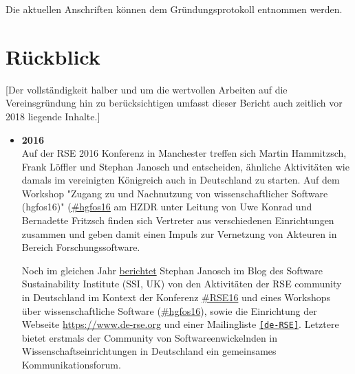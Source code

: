 Die aktuellen Anschriften können dem Gründungsprotokoll entnommen werden.

\section{Rückblick}

[Der vollständigkeit halber und um die wertvollen Arbeiten auf die Vereinsgründung hin zu berücksichtigen umfasst dieser Bericht auch zeitlich vor 2018 liegende Inhalte.]

\begin{itemize}
 \item \textbf{2016}\\
 Auf der RSE 2016 Konferenz in Manchester treffen sich Martin Hammitzsch, Frank Löffler und Stephan Janosch und entscheiden, ähnliche Aktivitäten wie damals im vereinigten Königreich auch in Deutschland zu starten. Auf dem Workshop "Zugang zu und Nachnutzung von wissenschaftlicher Software (hgfos16)" (\href{https://twitter.com/hashtag/hgfos16}{\#hgfos16} am HZDR unter Leitung von Uwe Konrad und Bernadette Fritzsch finden sich Vertreter aus verschiedenen Einrichtungen zusammen und geben damit einen Impuls zur Vernetzung von Akteuren in Bereich Forschungssoftware.  
 
 Noch im gleichen Jahr \href{https://www.software.ac.uk/blog/2016-12-19-research-software-germany-brief-report-efforts-autumn-2016}{berichtet} Stephan Janosch im Blog des Software Sustainability Institute (SSI, UK) von den Aktivitäten der RSE community in Deutschland im Kontext der Konferenz \href{https://ukrse.github.io/conf2016.html}{\#RSE16} und eines Workshops über wissenschaftliche Software (\href{https://twitter.com/hashtag/hgfos16}{\#hgfos16}), sowie die Einrichtung der Webseite \href{https://www.de-rse.org}{https://www.de-rse.org} und einer Mailingliste \href{https://ml-cgn04.ispgateway.de/mailman/listinfo/liste_de-rse.org}{\texttt{[de-RSE]}}.
 Letztere bietet erstmals der Community von Softwareenwickelnden in Wissenschaftseinrichtungen in Deutschland ein gemeinsames Kommunikationsforum.


\end{itemize}
